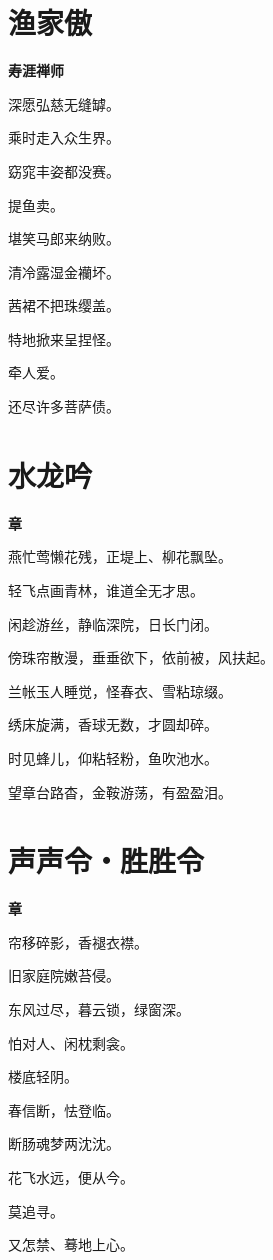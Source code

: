 \documentclass[12pt,a4paper]{ctexbook}
\begin{document}
\section{渔家傲}
\textbf{寿涯禅师}\par\vspace{0.5em}
深愿弘慈无缝罅。\par
乘时走入众生界。\par
窈窕丰姿都没赛。\par
提鱼卖。\par
堪笑马郎来纳败。\par
清冷露湿金襽坏。\par
茜裙不把珠缨盖。\par
特地掀来呈捏怪。\par
牵人爱。\par
还尽许多菩萨债。\par

\section{水龙吟}
\textbf{章}\par\vspace{0.5em}
燕忙莺懒花残，正堤上、柳花飘坠。\par
轻飞点画青林，谁道全无才思。\par
闲趁游丝，静临深院，日长门闭。\par
傍珠帘散漫，垂垂欲下，依前被，风扶起。\par
兰帐玉人睡觉，怪春衣、雪粘琼缀。\par
绣床旋满，香球无数，才圆却碎。\par
时见蜂儿，仰粘轻粉，鱼吹池水。\par
望章台路杳，金鞍游荡，有盈盈泪。\par

\section{声声令・胜胜令}
\textbf{章}\par\vspace{0.5em}
帘移碎影，香褪衣襟。\par
旧家庭院嫩苔侵。\par
东风过尽，暮云锁，绿窗深。\par
怕对人、闲枕剩衾。\par
楼底轻阴。\par
春信断，怯登临。\par
断肠魂梦两沈沈。\par
花飞水远，便从今。\par
莫追寻。\par
又怎禁、蓦地上心。\par
\end{document}
